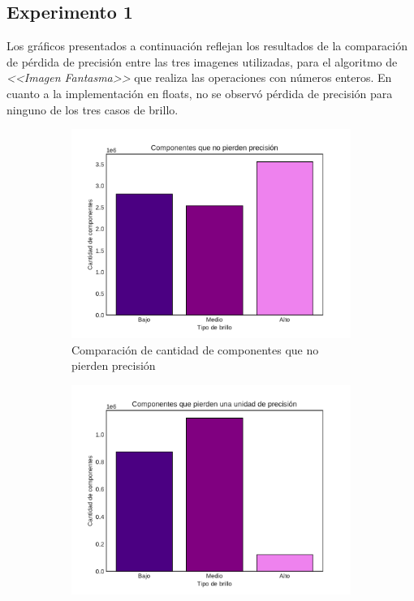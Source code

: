 \documentclass[a4paper]{article}
\begin{document}
\subsection{Experimento 1}

\justify
Los gráficos presentados a continuación reflejan los resultados de la comparación de pérdida de precisión entre las tres imagenes utilizadas, para el algoritmo de \textit{<<Imagen Fantasma>>} que realiza las operaciones con números enteros. En cuanto a la implementación en floats, no se observó pérdida de precisión para ninguno de los tres casos de brillo.
 
\begin{figure}[h]
	\centering
	\begin{subfigure}{0.49 \textwidth}
		\includegraphics[width=\textwidth]{img/Precision0.pdf}
			\caption{Comparación de cantidad de componentes que no pierden precisión}
	\end{subfigure}
	\hfill
	\begin{subfigure}{0.49 \textwidth}
		\includegraphics[width=\textwidth]{img/Precision1.pdf}

\end{subfigure}
\end{figure}
\end{document}
